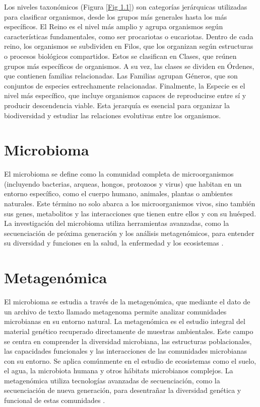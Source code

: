 Los niveles taxonómicos (Figura \ref{Fig 1.1}) son categorías jerárquicas utilizadas para clasificar organismos, desde los grupos más generales hasta los más específicos. El Reino es el nivel más amplio y agrupa organismos según características fundamentales, como ser procariotas o eucariotas. Dentro de cada reino, los organismos se subdividen en Filos, que los organizan según estructuras o procesos biológicos compartidos. Estos se clasifican en Clases, que reúnen grupos más específicos de organismos. A su vez, las clases se dividen en Órdenes, que contienen familias relacionadas. Las Familias agrupan Géneros, que son conjuntos de especies estrechamente relacionadas. Finalmente, la Especie es el nivel más específico, que incluye organismos capaces de reproducirse entre sí y producir descendencia viable. Esta jerarquía es esencial para organizar la biodiversidad y estudiar las relaciones evolutivas entre los organismos.\\

\section{Microbioma}
El microbioma se define como la comunidad completa de microorganismos (incluyendo bacterias, arqueas, hongos, 
protozoos y virus) que habitan en un entorno específico, como el cuerpo humano, animales, plantas o ambientes naturales. 
Este término no solo abarca a los microorganismos vivos, sino también sus genes, metabolitos y las interacciones que 
tienen entre ellos y con su huésped. La investigación del microbioma utiliza herramientas avanzadas, como la secuenciación 
de próxima generación y los análisis metagenómicos, para entender su diversidad y funciones en la salud, la enfermedad y 
los ecosistemas \citep{marchesi2015vocabulary}.\\


\section{Metagenómica}
\label{sec:metagenomica}
El microbioma se estudia a través de la metagenómica, que mediante el dato de un 
archivo de texto llamado metagenoma permite analizar comunidades microbianas en su entorno natural.
La metagenómica es el estudio integral del material genético recuperado directamente de muestras 
ambientales. Este campo se centra en comprender la diversidad microbiana, las estructuras poblacionales, 
las capacidades funcionales y las interacciones de las comunidades microbianas con su entorno. 
Se aplica comúnmente en el estudio de ecosistemas como el suelo, el agua, la microbiota humana 
y otros hábitats microbianos complejos. La metagenómica utiliza tecnologías avanzadas de secuenciación, 
como la secuenciación de nueva generación, para desentrañar la diversidad genética y funcional de estas 
comunidades \citep{zhang2021advances, oulas2015metagenomics, breitwieser2019review}.\\


